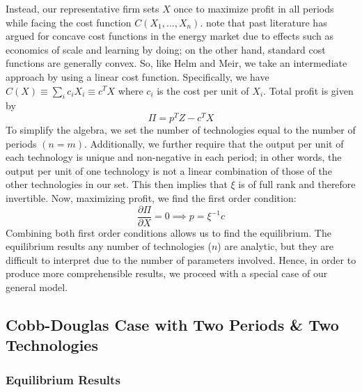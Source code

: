 \documentclass[11pt,a4paper]{extarticle}
\begin{document}
Instead, our representative firm sets $X$ once to maximize profit in all periods while facing the cost function $C(X_1, \dots, X_n)$.  \citet{HH} note that past literature has argued for concave cost functions in the energy market due to effects such as economics of scale and learning by doing; on the other hand, standard cost functions are generally convex. So, like Helm and Meir, we take an intermediate approach by using a linear cost function. Specifically, we have $C(X) \equiv \sum_i c_i X_i \equiv c^T X$ where $c_i$ is the cost per unit of $X_i$. Total profit is given by 
\begin{equation}
\Pi = p^T Z - c^T X
\end{equation}
To simplify the algebra, we set the number of technologies equal to the number of periods $(n=m)$. Additionally, we further require that the output per unit of each technology is unique and non-negative in each period; in other words, the output per unit of one technology is not a linear combination of those of the other technologies in our set. This then implies that $\xi$ is of full rank and therefore invertible.  Now, maximizing profit, we find the first order condition:
\begin{equation}
\frac{\partial \Pi}{\partial X} = 0 \implies p = \xi^{-1} c
\end{equation}
Combining both first order conditions allows us to find the equilibrium. The equilibrium results any number of technologies ($n$) are analytic, but they are difficult to interpret due to the number of parameters involved. Hence, in order to produce more comprehensible results, we proceed with a special case of our general model. 

\subsection{Cobb-Douglas Case with Two Periods \& Two Technologies}

\subsubsection{Equilibrium Results}
\end{document}
